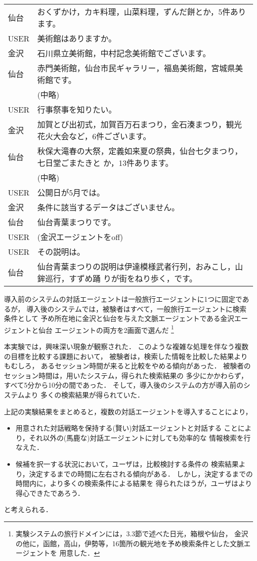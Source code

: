 \begin{table}[htp]
\begin{tabular}[t]{lp{50mm}}
仙台&	おくずかけ，カキ料理，山菜料理，ずんだ餅とか，5件あります。\\
USER&	美術館はありますか。\\
金沢&	石川県立美術館，中村記念美術館でございます。\\
仙台&	赤門美術館，仙台市民ギャラリー，福島美術館，宮城県美術館です。\\
    & (中略)\\
USER&	行事祭事を知りたい。\\
金沢&	加賀とび出初式，加賀百万石まつり，金石湊まつり，観光花火大会など，6件ございます。\\
仙台&	秋保大滝春の大祭，定義如来夏の祭典，仙台七夕まつり，七日堂ごまたきと
か，13件あります。\\
    & (中略)\\
USER&	公開日が5月では。\\
金沢&	条件に該当するデータはございません。\\
仙台&	仙台青葉まつりです。\\
USER& (金沢エージェントをoff)\\
USER&   その説明は。\\
仙台&   仙台青葉まつりの説明は伊達模様武者行列，おみこし，山鉾巡行，すずめ踊
りが街をねり歩く，です。\\
\hline\hline
\end{tabular}
\end{table}

導入前のシステムの対話エージェントは一般旅行エージェントに1つに固定であるが，
導入後のシステムでは，被験者はすべて，一般旅行エージェントに検索条件として
予め所在地に金沢と仙台を与えた文脈エージェントである金沢エージェントと仙台
エージェントの両方を2画面で選んだ
\footnote{実験システムの旅行ドメインには，3.3節で述べた日光，箱根や仙台，
金沢の他に，函館，高山，伊勢等，16箇所の観光地を予め検索条件とした文脈エージェントを
用意した．}

本実験では，興味深い現象が観察された．
このような複雑な処理を伴なう複数の目標を比較する課題において，
被験者は，検索した情報を比較した結果よりもむしろ，
あるセッション時間が来ると比較をやめる傾向があった．
被験者のセッション時間は，用いたシステム，得られた検索結果の
多少にかかわらず，すべて5分から10分の間であった．
そして，導入後のシステムの方が導入前のシステムより
多くの検索結果が得られていた．
\bigskip

上記の実験結果をまとめると，複数の対話エージェントを導入することにより，
\begin{itemize}
\item 用意された対話戦略を保持する(賢い)対話エージェントと対話する
ことにより，それ以外の(馬鹿な)対話エージェントに対しても効率的な
情報検索を行なえた．
\item 候補を択一する状況において，ユーザは，比較検討する条件の
検索結果より，決定するまでの時間に左右される傾向がある．
しかし，決定するまでの時間内に，より多くの検索条件による結果を
得られたほうが，ユーザはより得心できたであろう．
\end{itemize}
と考えられる．

